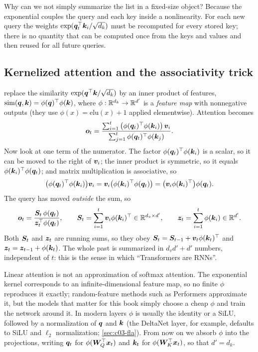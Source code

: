 Why can we not simply summarize the list in a fixed-size object? Because the exponential couples
the query and each key inside a nonlinearity. For each new query the weights
$\exp(\bm{q}_t^{\top}\bm{k}_i/\sqrt{d_k})$ must be recomputed for every stored key; there is no quantity
that can be computed once from the keys and values and then reused for all future queries.

\subsection{Kernelized attention and the associativity trick}

\citet{katharopoulos2020transformers} replace the similarity $\exp(\bm{q}^{\top}\bm{k}/\sqrt{d_k})$ by an
inner product of features, $\mathrm{sim}(\bm{q},\bm{k})=\phi(\bm{q})^{\top}\phi(\bm{k})$, where
$\phi:\mathbb{R}^{d_k}\to\mathbb{R}^{d'}$ is a \emph{feature map} with nonnegative outputs (they use
$\phi(x)=\mathrm{elu}(x)+1$ applied elementwise). Attention becomes
\begin{equation}\label{eq:c03-kernel-attn}
  \bm{o}_t=\frac{\sum_{i=1}^{t}\big(\phi(\bm{q}_t)^{\top}\phi(\bm{k}_i)\big)\,\bm{v}_i}
             {\sum_{j=1}^{t}\phi(\bm{q}_t)^{\top}\phi(\bm{k}_j)} .
\end{equation}
Now look at one term of the numerator. The factor $\phi(\bm{q}_t)^{\top}\phi(\bm{k}_i)$ is a scalar, so it
can be moved to the right of $\bm{v}_i$; the inner product is symmetric, so it equals
$\phi(\bm{k}_i)^{\top}\phi(\bm{q}_t)$; and matrix multiplication is associative, so
\[
  \big(\phi(\bm{q}_t)^{\top}\phi(\bm{k}_i)\big)\bm{v}_i
  =\bm{v}_i\big(\phi(\bm{k}_i)^{\top}\phi(\bm{q}_t)\big)
  =\big(\bm{v}_i\phi(\bm{k}_i)^{\top}\big)\phi(\bm{q}_t).
\]
The query has moved \emph{outside} the sum, so
\begin{equation}\label{eq:c03-la-normalized}
  \bm{o}_t=\frac{\bm{S}_t\,\phi(\bm{q}_t)}{\bm{z}_t^{\top}\phi(\bm{q}_t)},\qquad
  \bm{S}_t=\sum_{i=1}^{t}\bm{v}_i\phi(\bm{k}_i)^{\top}\in\mathbb{R}^{d_v\times d'},\qquad
  \bm{z}_t=\sum_{i=1}^{t}\phi(\bm{k}_i)\in\mathbb{R}^{d'}.
\end{equation}
Both $\bm{S}_t$ and $\bm{z}_t$ are running sums, so they obey
$\bm{S}_t=\bm{S}_{t-1}+\bm{v}_t\phi(\bm{k}_t)^{\top}$ and $\bm{z}_t=\bm{z}_{t-1}+\phi(\bm{k}_t)$. The whole past is
summarized in $d_v d'+d'$ numbers, independent of $t$: this is the sense in which
``Transformers are RNNs''.

Linear attention is not an approximation of softmax attention. The exponential kernel
corresponds to an infinite-dimensional feature map, so no finite $\phi$ reproduces it exactly;
random-feature methods such as Performers \citep{c03-choromanski2021performers} approximate it,
but the models that matter for this book simply choose a cheap $\phi$ and train the network
around it. In modern layers $\phi$ is usually the identity or a SiLU, followed by a
normalization of $\bm{q}$ and $\bm{k}$ (the \fla{} DeltaNet layer, for example, defaults to SiLU and
$\ell_2$ normalization; \cref{sec:c03-fla}). From now on we absorb $\phi$ into the projections,
writing $\bm{q}_t$ for $\phi(\bm{W}_Q^{\top}\bm{x}_t)$ and $\bm{k}_t$ for $\phi(\bm{W}_K^{\top}\bm{x}_t)$, so that $d'=d_k$.

